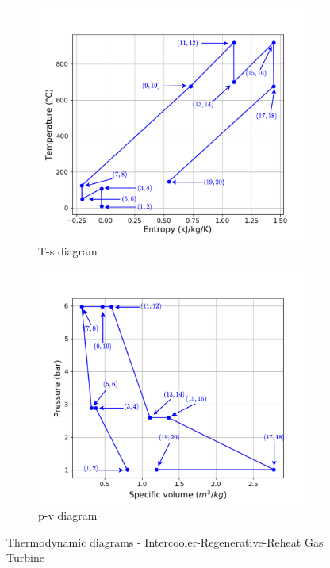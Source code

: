 \begin{figure}[h]
     \centering
     \begin{subfigure}[b]{0.4\textwidth}
         \centering
         \includegraphics[width=\textwidth]{Ts_IRHGT}
         \caption{T-s diagram}
         \label{fig:C5_Ts_IRHGT}
     \end{subfigure}
     \begin{subfigure}[b]{0.4\textwidth}
         \centering
         \includegraphics[width=\textwidth]{pv_IRHGT}
         \caption{p-v diagram}
         \label{fig:C5_pv_IRHGT}
     \end{subfigure}
        \caption{Thermodynamic diagrams - Intercooler-Regenerative-Reheat Gas Turbine}
        \label{fig:C5_thermo_diagram_IRHGT}
\end{figure}


